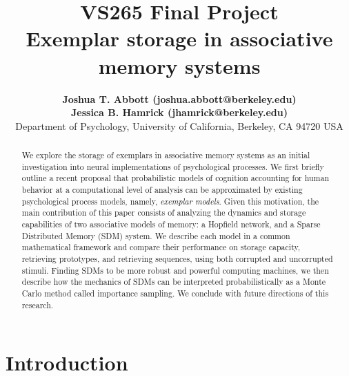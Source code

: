 \documentclass[10pt,letterpaper]{article}
\title{{\bf VS265 Final Project}\\Exemplar storage in associative memory systems}
\author{{\large \bf Joshua T. Abbott (joshua.abbott@berkeley.edu)\footnoteremember{myfootnote}{The authors contributed equally to this work.}} \\
 {\large \bf Jessica B. Hamrick (jhamrick@berkeley.edu)\footnoterecall{myfootnote}} \\
  Department of Psychology, University of California, Berkeley, CA 94720 USA}
\date{}
\begin{document}
\maketitle

\begin{abstract}
We explore the storage of exemplars in associative memory systems as an initial investigation into neural implementations of psychological processes. We first briefly outline a recent proposal that probabilistic models of cognition accounting for human behavior at a computational level of analysis can be approximated by existing psychological process models, namely, \textit{exemplar models}. Given this motivation, the main contribution of this paper consists of analyzing the dynamics and storage capabilities of two associative models of memory: a Hopfield network, and a Sparse Distributed Memory (SDM) system. We describe each model in a common mathematical framework and compare their performance  on storage capacity, retrieving prototypes, and retrieving sequences, using both corrupted and uncorrupted stimuli. Finding SDMs to be more robust and powerful computing machines, we then describe how the mechanics of SDMs can be interpreted probabilistically as a Monte Carlo method called importance sampling. We conclude with future directions of this research. 

\end{abstract}

\section{Introduction}
\end{document}
